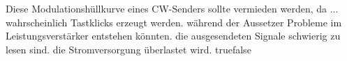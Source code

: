     {Diese Modulationshüllkurve eines CW-Senders sollte vermieden werden, da ...}
    {wahrscheinlich Tastklicks erzeugt werden.}
    {während der Aussetzer Probleme im Leistungsverstärker entstehen könnten.}
    {die ausgesendeten Signale schwierig zu lesen sind.}
    {die Stromversorgung überlastet wird.}
    {true}{false}